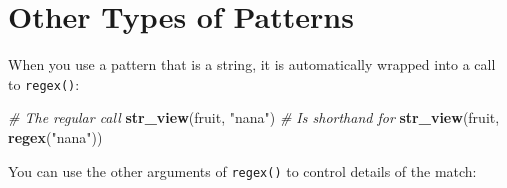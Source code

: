 \documentclass[]{book}
\newenvironment{Shaded}{\begin{snugshade}}{\end{snugshade}}
\newcommand{\KeywordTok}[1]{\textcolor[rgb]{0.13,0.29,0.53}{\textbf{#1}}}
\newcommand{\StringTok}[1]{\textcolor[rgb]{0.31,0.60,0.02}{#1}}
\newcommand{\CommentTok}[1]{\textcolor[rgb]{0.56,0.35,0.01}{\textit{#1}}}
\newcommand{\NormalTok}[1]{#1}
\begin{document}
\section{Other Types of Patterns}\label{other-types-of-patterns}

When you use a pattern that is a string, it is automatically wrapped
into a call to \texttt{regex()}:

\begin{Shaded}
\begin{Highlighting}[]
\CommentTok{# The regular call}
\KeywordTok{str_view}\NormalTok{(fruit, }\StringTok{"nana"}\NormalTok{)}
\CommentTok{# Is shorthand for}
\KeywordTok{str_view}\NormalTok{(fruit, }\KeywordTok{regex}\NormalTok{(}\StringTok{"nana"}\NormalTok{))}
\end{Highlighting}
\end{Shaded}

You can use the other arguments of \texttt{regex()} to control details
of the match:
\end{document}
